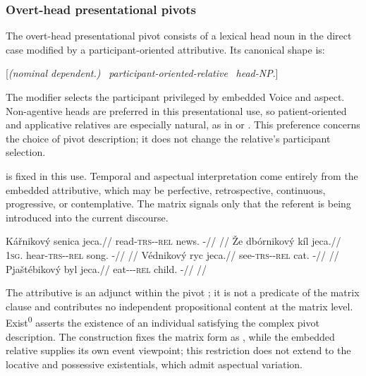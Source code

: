 \subsubsection{Overt-head presentational pivots}
\label{sec:exst-overt-head}

The overt-head presentational pivot consists of a lexical head noun in the direct
case modified by a participant-oriented attributive. Its canonical shape is:

\begin{center}
[\textit{(nominal dependent.\Ind{})} \ \textit{participant-oriented-relative} \ \textit{head-NP}.\Dir{}] \ \ 
\end{center}

The modifier selects the participant privileged by embedded Voice and aspect.
Non-agentive heads are preferred in this presentational use, so patient-oriented
and applicative relatives are especially natural, as in  or . This preference
concerns the choice of pivot description; it does not change the relative's participant
selection.

 is fixed in this use. Temporal and aspectual interpretation come
entirely from the embedded attributive, which may be perfective, retrospective,
continuous, progressive, or contemplative. The matrix  signals only
that the referent is being introduced into the current discourse.

\pex
\a
\begingl
\gla Kářnikový senica jeca.//
\glb read-\textsc{trs}-\Pf{}-\textsc{rel} news.\Dir{} \Exst{}-\Cont{}//
\glft {} //
\endgl
\a
\begingl
\gla Že dbórnikový kíl jeca.//
\glb \textsc{1sg}.\Ind{} hear-\textsc{trs}-\Pf{}-\textsc{rel} song.\Dir{} \Exst{}-\Cont{}//
\glft {} //
\endgl
\a
\begingl
\gla Védnikový ryc jeca.//
\glb see-\textsc{trs}-\Pf{}-\textsc{rel} cat.\Dir{} \Exst{}-\Cont{}//
\glft {} //
\endgl
\a
\begingl
\gla Pjaštébikový byl jeca.//
\glb eat-\Appl{}-\Pf{}-\textsc{rel} child.\Dir{} \Exst{}-\Cont{}//
\glft {} //
\endgl
\xe

The attributive is an adjunct within the pivot ; it is not a
predicate of the matrix clause and contributes no independent propositional
content at the matrix level. Exist\textsuperscript{0} asserts the existence
of an individual satisfying the complex pivot description. The construction
fixes the matrix form as , while the embedded relative supplies
its own event viewpoint; this restriction does not extend to the locative and
possessive existentials, which admit aspectual variation.

